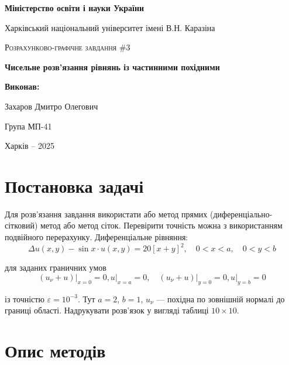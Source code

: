 \documentclass[14pt]{extarticle}
\begin{document}
\begin{titlepage}
	\centering
	{\textbf{Міністерство освіти і науки України}\par
 Харківський національний університет імені В.Н. Каразіна\par}
    \vspace{1cm}
	{\Large \textsc{Розрахунково-графічне завдання \#3}\par
    \textbf{Чисельне розв'язання рівнянь із частинними похідними}\par}
	\vfill
 \begin{FlushRight}
	\textbf{Виконав:}\par Захаров Дмитро Олегович \par Група МП-41
\end{FlushRight}
	\vfill

	{\large Харків -- 2025\par}
\end{titlepage}

\tableofcontents
\pagebreak

\section{Постановка задачі}

Для розв'язання завдання використати або метод прямих (диференціально-сітковий)
метод або метод сіток. Перевірити точність можна з використанням подвійного
перерахунку. Диференціальне рівняння:
\begin{equation*}
    \Delta u(x,y) - \sin x \cdot u(x,y) = 20[x+y]^2, \quad 0 < x < a, \quad 0 < y < b 
\end{equation*}

для заданих граничних умов
\begin{equation*}
    (u_{\nu}+u)\Big|_{x=0} = 0, u\Big|_{x=a} = 0, \quad (u_{\nu}+u)\Big|_{y=0} = 0, u\Big|_{y=b} = 0
\end{equation*}

із точністю $\varepsilon = 10^{-3}$. Тут $a=2$, $b=1$, $u_{\nu}$ --- похідна 
по зовнішній нормалі до границі області. Надрукувати розв'язок у вигляді 
таблиці $10 \times 10$. 

\pagebreak
\section{Опис методів}
\end{document}
